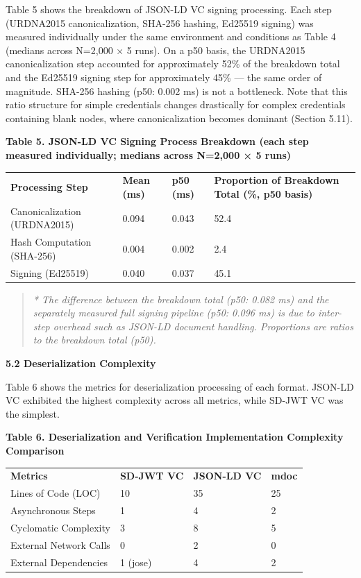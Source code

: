 Table 5 shows the breakdown of JSON-LD VC signing processing. Each step (URDNA2015 canonicalization, SHA-256 hashing, Ed25519 signing) was measured individually under the same environment and conditions as Table 4 (medians across N=2,000 × 5 runs). On a p50 basis, the URDNA2015 canonicalization step accounted for approximately 52\% of the breakdown total and the Ed25519 signing step for approximately 45\% --- the same order of magnitude. SHA-256 hashing (p50: 0.002 ms) is not a bottleneck. Note that this ratio structure for simple credentials changes drastically for complex credentials containing blank nodes, where canonicalization becomes dominant (Section 5.11).

\textbf{Table 5. JSON-LD VC Signing Process Breakdown (each step measured individually; medians across N=2,000 × 5 runs)}

\begin{longtable}[]{@{}llll@{}}
\toprule
\endhead
\textbf{Processing Step} & \textbf{Mean (ms)} & \textbf{p50 (ms)} & \textbf{Proportion of Breakdown Total (\%, p50 basis)}\tabularnewline
Canonicalization (URDNA2015) & 0.094 & 0.043 & 52.4\tabularnewline
Hash Computation (SHA-256) & 0.004 & 0.002 & 2.4\tabularnewline
Signing (Ed25519) & 0.040 & 0.037 & 45.1\tabularnewline
\bottomrule
\end{longtable}

\begin{quote}
\emph{* The difference between the breakdown total (p50: 0.082 ms) and the separately measured full signing pipeline (p50: 0.096 ms) is due to inter-step overhead such as JSON-LD document handling. Proportions are ratios to the breakdown total (p50).}
\end{quote}

\textbf{5.2 Deserialization Complexity}

Table 6 shows the metrics for deserialization processing of each format. JSON-LD VC exhibited the highest complexity across all metrics, while SD-JWT VC was the simplest.

\textbf{Table 6. Deserialization and Verification Implementation Complexity Comparison}

\begin{longtable}[]{@{}llll@{}}
\toprule
\endhead
\textbf{Metrics} & \textbf{SD-JWT VC} & \textbf{JSON-LD VC} & \textbf{mdoc}\tabularnewline
Lines of Code (LOC) & 10 & 35 & 25\tabularnewline
Asynchronous Steps & 1 & 4 & 2\tabularnewline
Cyclomatic Complexity & 3 & 8 & 5\tabularnewline
External Network Calls & 0 & 2 & 0\tabularnewline
External Dependencies & 1 (jose) & 4 & 2\tabularnewline
\bottomrule
\end{longtable}

